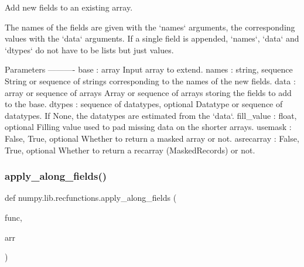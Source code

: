 \begin{DoxyVerb}Add new fields to an existing array.

The names of the fields are given with the `names` arguments,
the corresponding values with the `data` arguments.
If a single field is appended, `names`, `data` and `dtypes` do not have
to be lists but just values.

Parameters
----------
base : array
    Input array to extend.
names : string, sequence
    String or sequence of strings corresponding to the names
    of the new fields.
data : array or sequence of arrays
    Array or sequence of arrays storing the fields to add to the base.
dtypes : sequence of datatypes, optional
    Datatype or sequence of datatypes.
    If None, the datatypes are estimated from the `data`.
fill_value : {float}, optional
    Filling value used to pad missing data on the shorter arrays.
usemask : {False, True}, optional
    Whether to return a masked array or not.
asrecarray : {False, True}, optional
    Whether to return a recarray (MaskedRecords) or not.\end{DoxyVerb}
 \mbox{\label{namespacenumpy_1_1lib_1_1recfunctions_ae04a050fda938849310c5f8d7d22a79d}} 
\subsubsection{\texorpdfstring{apply\+\_\+along\+\_\+fields()}{apply\_along\_fields()}}
{\footnotesize\ttfamily def numpy.\+lib.\+recfunctions.\+apply\+\_\+along\+\_\+fields (\begin{DoxyParamCaption}\item[{}]{func,  }\item[{}]{arr }\end{DoxyParamCaption})}

